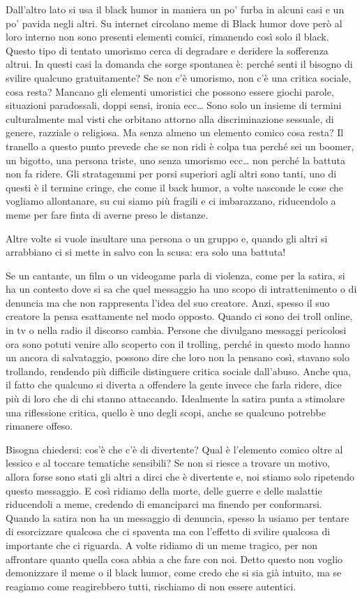 \documentclass[12pt]{book} %
\begin{document}
\begin{mdframed}[linewidth=1pt]
Dall'altro lato si usa il black humor in maniera un po' furba in alcuni casi e
un po' pavida negli altri. Su internet circolano meme di Black humor dove però al loro interno non sono presenti elementi comici, rimanendo così solo il black. Questo tipo di tentato umorismo cerca di degradare e
deridere la sofferenza altrui. In questi casi la domanda che sorge spontanea è: perché senti il bisogno di svilire
qualcuno gratuitamente? Se non c'è umorismo, non c'è una critica sociale, cosa resta? Mancano gli elementi umoristici che possono essere giochi parole, situazioni paradossali, doppi sensi, ironia ecc… Sono solo un insieme
di termini culturalmente mal visti che orbitano attorno alla discriminazione sessuale, di genere, razziale o religiosa. Ma senza almeno un elemento comico cosa resta? Il tranello a questo punto prevede che se non ridi è colpa tua perché sei un boomer, un bigotto, una persona triste, uno senza umorismo ecc… non perché la battuta non fa ridere.
Gli stratagemmi per porsi superiori agli altri sono tanti, uno di questi è il termine cringe, che come il back humor, a volte nasconde le cose che vogliamo allontanare, su cui siamo più fragili e ci imbarazzano, riducendolo a meme per fare finta di averne preso le distanze.

Altre volte si vuole insultare una persona o un gruppo e, quando gli altri si arrabbiano ci si mette in salvo con la scusa: era solo una battuta!

Se un cantante, un film o un videogame parla di violenza, come per la satira, si ha un contesto dove si sa che quel messaggio ha uno scopo di intrattenimento o di denuncia ma che non rappresenta l'idea del suo creatore. Anzi, spesso il suo creatore la pensa esattamente nel modo opposto. Quando ci sono dei troll online, in tv o nella radio il discorso cambia. Persone che divulgano messaggi pericolosi ora sono potuti venire allo scoperto con il trolling, perché in questo modo hanno un ancora di salvataggio, possono dire che loro non la pensano così, stavano solo trollando, rendendo più difficile distinguere critica sociale dall'abuso.
Anche qua, il fatto che qualcuno si diverta a offendere la gente invece che farla ridere, dice più di loro che di chi stanno attaccando.
Idealmente la satira punta a stimolare una riflessione critica, quello è uno degli scopi, anche se qualcuno potrebbe rimanere offeso.

Bisogna chiedersi: cos'è che c'è di divertente? Qual è l'elemento comico oltre al lessico e al toccare tematiche sensibili? Se non si riesce a trovare un motivo, allora forse sono stati gli altri a dirci che è
divertente e, noi stiamo solo ripetendo questo messaggio. E così ridiamo della morte, delle guerre e delle malattie riducendoli a meme, credendo di emanciparci ma finendo per conformarsi. Quando la satira non ha un messaggio di denuncia, spesso la usiamo per tentare di esorcizzare
qualcosa che ci spaventa ma con l'effetto di svilire qualcosa di importante che ci riguarda. A volte ridiamo di un meme
tragico, per non affrontare quanto quella cosa abbia a che fare con noi. Detto questo non voglio demonizzare il meme o il black humor, come credo che si sia già intuito, ma se reagiamo come reagirebbero tutti, rischiamo di non essere autentici.


\end{mdframed}
\end{document}
